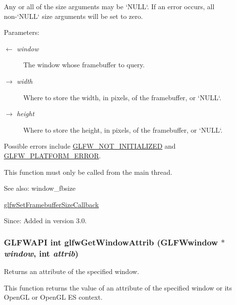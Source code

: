 Any or all of the size arguments may be `NULL`. If an error occurs, all non-`NULL` size arguments will be set to zero.

\begin{Desc}
\item[Parameters:]
\begin{description}
\item[\mbox{$\leftarrow$} {\em window}]The window whose framebuffer to query. \item[\mbox{$\rightarrow$} {\em width}]Where to store the width, in pixels, of the framebuffer, or `NULL`. \item[\mbox{$\rightarrow$} {\em height}]Where to store the height, in pixels, of the framebuffer, or `NULL`.\end{description}
\end{Desc}
Possible errors include \hyperlink{group__errors_g2374ee02c177f12e1fa76ff3ed15e14a}{GLFW\_\-NOT\_\-INITIALIZED} and \hyperlink{group__errors_gd44162d78100ea5e87cdd38426b8c7a1}{GLFW\_\-PLATFORM\_\-ERROR}.

This function must only be called from the main thread.

\begin{Desc}
\item[See also:]window\_\-fbsize 

\hyperlink{group__window_gd766bcdb4465f9c6c62e5d8ca7cfba56}{glfwSetFramebufferSizeCallback}\end{Desc}
\begin{Desc}
\item[Since:]Added in version 3.0. \end{Desc}
\hypertarget{group__window_g1bb0c7e100418e284dbb800789c63d40}{
\subsubsection[glfwGetWindowAttrib]{\setlength{\rightskip}{0pt plus 5cm}GLFWAPI int glfwGetWindowAttrib ({\bf GLFWwindow} $\ast$ {\em window}, \/  int {\em attrib})}}
\label{group__window_g1bb0c7e100418e284dbb800789c63d40}


Returns an attribute of the specified window. 

This function returns the value of an attribute of the specified window or its OpenGL or OpenGL ES context.

